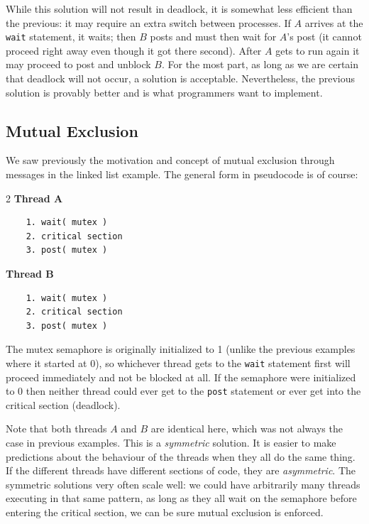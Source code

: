 While this solution will not result in deadlock, it is somewhat less efficient than the previous: it may require an extra switch between processes. If $A$ arrives at the \texttt{wait} statement, it waits; then $B$ posts and must then wait for $A$'s post (it cannot proceed right away even though it got there second). After $A$ gets to run again it may proceed to post and unblock $B$. For the most part, as long as we are certain that deadlock will not occur, a solution is acceptable. Nevertheless, the previous solution is provably better and is what programmers want to implement.

\subsection*{Mutual Exclusion}
We saw previously the motivation and concept of mutual exclusion through messages in the linked list example. The general form in pseudocode is of course:

\begin{multicols}{2}
	\textbf{Thread A}\vspace{-2em}
	\begin{verbatim}
	1. wait( mutex )
	2. critical section
	3. post( mutex )
  \end{verbatim}
	\columnbreak
	\textbf{Thread B}\vspace{-2em}
	\begin{verbatim}
	1. wait( mutex )
	2. critical section
	3. post( mutex )
  \end{verbatim}
\end{multicols}
\vspace{-2em}

The mutex semaphore is originally initialized to 1 (unlike the previous examples where it started at 0), so whichever thread gets to the \texttt{wait} statement first will proceed immediately and not be blocked at all. If the semaphore were initialized to 0 then neither thread could ever get to the \texttt{post} statement or ever get into the critical section (deadlock).

Note that both threads $A$ and $B$ are identical here, which was not always the case in previous examples. This is a \textit{symmetric} solution. It is easier to make predictions about the behaviour of the threads when they all do the same thing. If the different threads have different sections of code, they are \textit{asymmetric}. The symmetric solutions very often scale well: we could have arbitrarily many threads executing in that same pattern, as long as they all wait on the semaphore before entering the critical section, we can be sure mutual exclusion is enforced.


